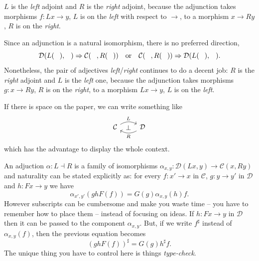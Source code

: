 
\(L\) is the {\em left} adjoint and \(R\) is the {\em right} adjoint,
because the adjunction takes morphisms \(f : Lx \to y\), \(L\) is on the
{\em left} with respect to \(\to\), to a morphism \(x \to Ry\), \(R\) is on
the {\em right}.

Since an adjunction is a natural isomorphism, there is no preferred
direction,
\[
  \mathcal{D}(L(\hole), \hole) \Rightarrow \mathcal{C}(\hole, R(\hole)) \quad\text{or}\quad \mathcal{C}(\hole, R(\hole))
  \Rightarrow \mathcal{D}(L(\hole), \hole) .
\]
Nonetheless, the pair of adjectives {\em left}/{\em right} continues to
do a decent job: \(R\) is the {\em right} adjoint and \(L\) is the {\em
  left} one, because the adjunction takes morphisms \(g : x \to Ry\),
\(R\) is on the {\em right}, to a morphism \(Lx \to y\), \(L\) is on the
{\em left}.

If there is space on the paper, we can write something like
\begin{equation}
  \begin{tikzcd}
    \mathcal{C} \ar["L"{name=L}, r, bend left] & \mathcal{D} \ar["R"{name=R}, l, bend left]
    \ar["\perp"{description}, from=L, to=R, phantom]
  \end{tikzcd}
  \label{diagram:AdjunctionII}
\end{equation}
which has the advantage to display the whole context.

An adjuction \(\alpha : L \dashv R\) is a family of isomorphisms
\(\alpha_{x, y} : \mathcal{D} (Lx, y) \to \mathcal{C}(x, Ry)\) and naturality can be stated
explicitly as: for every \(f : x' \to x\) in \(\mathcal{C}\),
\(g : y \to y'\) in \(\mathcal{D}\) and \(h : Fx \to y\) we have
\[
  \alpha_{x', y'} (g h F(f)) = G(g) \alpha_{x, y}(h) f .
\]
However subscripts can be cumbersome and make you waste time -- you have
to remember how to place them -- instead of focusing on ideas. If
\(h : Fx \to y\) in \(\mathcal{D}\) then it can be passed to the component
\(\alpha_{x, y}\). But, if we write \(f^\sharp\) instead of
\(\alpha_{x, y} (f)\), then the previous equation becomes
\begin{equation}
  (ghF(f))^\sharp = G(g) h^\sharp f .
  \label{eqn:NatualityAdjunction}
\end{equation}
The unique thing you have to control here is things {\em type-check}.


